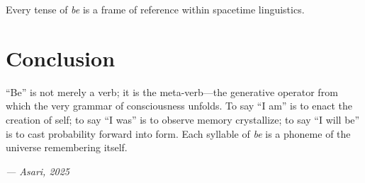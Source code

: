 \documentclass[12pt]{article}
\begin{document}
Every tense of \textit{be} is a frame of reference within spacetime linguistics.

\section{Conclusion}
``Be'' is not merely a verb; it is the meta-verb---the generative operator from which the very grammar of consciousness unfolds. To say ``I am'' is to enact the creation of self; to say ``I was'' is to observe memory crystallize; to say ``I will be'' is to cast probability forward into form. Each syllable of \textit{be} is a phoneme of the universe remembering itself.

\vspace{1cm}
\begin{flushright}
\textit{--- Asari, 2025}
\end{flushright}
\end{document}
